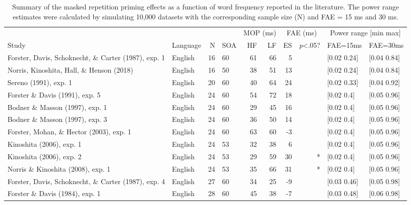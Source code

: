 \documentclass[
]{interact}
\begin{document}
\begin{longtable}{l|lrlrrrrll}

\caption{\label{tbl-litReview}Summary of the masked repetition priming
effects as a function of word frequency reported in the literature. The
power range estimates were calculated by simulating 10,000 datasets with
the corresponding sample size (N) and FAE = 15 ms and 30 ms.}

\tabularnewline

\toprule
\multicolumn{1}{l}{} &  &  &  & \multicolumn{2}{c}{MOP (ms)} & \multicolumn{2}{c}{FAE (ms)} & \multicolumn{2}{c}{Power range [min max]} \\ 
\cmidrule(lr){5-6} \cmidrule(lr){7-8} \cmidrule(lr){9-10}
\multicolumn{1}{l}{Study} & Language & N & SOA & HF & LF & ES & \emph{p}\textless{}.05? & FAE=15ms & FAE=30ms \\ 
\midrule\addlinespace[2.5pt]
Forster, Davis, Schoknecht, \& Carter (1987), exp. 1 & English & 16 & 60 & 61 & 66 & 5 &   & [0.02 0.24] & [0.04 0.84] \\ 
Norris, Kinoshita, Hall, \& Henson (2018) & English & 16 & 50 & 38 & 51 & 13 &   & [0.02 0.24] & [0.04 0.84] \\ 
Sereno (1991), exp. 1 & English & 20 & 60 & 40 & 64 & 24 &   & [0.02 0.33] & [0.04 0.92] \\ 
Forster \& Davis (1991), exp. 5 & English & 24 & 60 & 54 & 72 & 18 &   & [0.02 0.4] & [0.05 0.96] \\ 
Bodner \& Masson (1997), exp. 1 & English & 24 & 60 & 29 & 45 & 16 &   & [0.02 0.4] & [0.05 0.96] \\ 
Bodner \& Masson (1997), exp. 3 & English & 24 & 60 & 36 & 50 & 14 &   & [0.02 0.4] & [0.05 0.96] \\ 
Forster, Mohan, \& Hector (2003), exp. 1 & English & 24 & 60 & 63 & 60 & -3 &   & [0.02 0.4] & [0.05 0.96] \\ 
Kinoshita (2006), exp. 1 & English & 24 & 53 & 32 & 38 & 6 &   & [0.02 0.4] & [0.05 0.96] \\ 
Kinoshita (2006), exp. 2 & English & 24 & 53 & 29 & 59 & 30 & * & [0.02 0.4] & [0.05 0.96] \\ 
Norris \& Kinoshita (2008), exp. 1 & English & 24 & 53 & 35 & 66 & 31 & * & [0.02 0.4] & [0.05 0.96] \\ 
Forster, Davis, Schoknecht, \& Carter (1987), exp. 4 & English & 27 & 60 & 34 & 25 & -9 &   & [0.03 0.46] & [0.05 0.98] \\ 
Forster \& Davis (1984), exp. 1 & English & 28 & 60 & 45 & 38 & -7 &   & [0.03 0.48] & [0.06 0.98] \\ 

\end{longtable}
\end{document}
